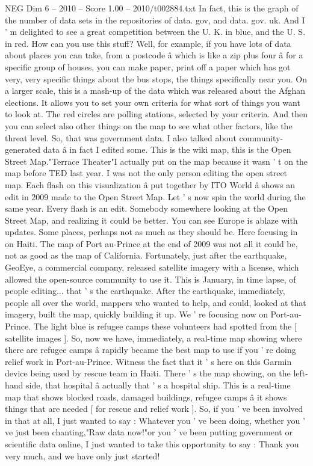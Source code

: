 \begin{textsample}{NEG Dim 6 – 2010 – Score 1.00 – 2010/t002884.txt}
In fact, this is the graph of the number of data sets in the repositories of data. gov, and data. gov. uk.
And I ' m delighted to see a great competition between the U.
K. in blue, and the U.
S. in red.
How can you use this stuff?
Well, for example, if you have lots of data about places you can take, from a postcode â which is like a zip plus four â for a specific group of houses, you can make paper, print off a paper which has got very, very specific things about the bus stops, the things specifically near you.
On a larger scale, this is a mash-up of the data which was released about the Afghan elections.
It allows you to set your own criteria for what sort of things you want to look at.
The red circles are polling stations, selected by your criteria.
And then you can select also other things on the map to see what other factors, like the threat level.
So, that was government data.
I also talked about community-generated data â in fact I edited some.
This is the wiki map, this is the Open Street Map."Terrace Theater"I actually put on the map because it wasn ' t on the map before TED last year.
I was not the only person editing the open street map.
Each flash on this visualization â put together by ITO World â shows an edit in 2009 made to the Open Street Map.
Let ' s now spin the world during the same year.
Every flash is an edit.
Somebody somewhere looking at the Open Street Map, and realizing it could be better.
You can see Europe is ablaze with updates.
Some places, perhaps not as much as they should be.
Here focusing in on Haiti.
The map of Port au-Prince at the end of 2009 was not all it could be, not as good as the map of California.
Fortunately, just after the earthquake, GeoEye, a commercial company, released satellite imagery with a license, which allowed the open-source community to use it.
This is January, in time lapse, of people editing... that ' s the earthquake.
After the earthquake, immediately, people all over the world, mappers who wanted to help, and could, looked at that imagery, built the map, quickly building it up.
We ' re focusing now on Port-au-Prince.
The light blue is refugee camps these volunteers had spotted from the [ satellite images ].
So, now we have, immediately, a real-time map showing where there are refugee camps â rapidly became the best map to use if you ' re doing relief work in Port-au-Prince.
Witness the fact that it ' s here on this Garmin device being used by rescue team in Haiti.
There ' s the map showing, on the left-hand side, that hospital â actually that ' s a hospital ship.
This is a real-time map that shows blocked roads, damaged buildings, refugee camps â it shows things that are needed [ for rescue and relief work ].
So, if you ' ve been involved in that at all, I just wanted to say : Whatever you ' ve been doing, whether you ' ve just been chanting,"Raw data now!"or you ' ve been putting government or scientific data online, I just wanted to take this opportunity to say : Thank you very much, and we have only just started!

\end{textsample}
